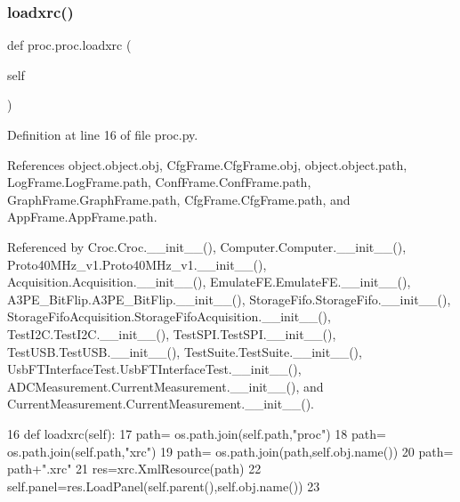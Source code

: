 \subsubsection{\texorpdfstring{loadxrc()}{loadxrc()}}
{\footnotesize\ttfamily def proc.\+proc.\+loadxrc (\begin{DoxyParamCaption}\item[{}]{self }\end{DoxyParamCaption})}



Definition at line 16 of file proc.\+py.



References object.\+object.\+obj, Cfg\+Frame.\+Cfg\+Frame.\+obj, object.\+object.\+path, Log\+Frame.\+Log\+Frame.\+path, Conf\+Frame.\+Conf\+Frame.\+path, Graph\+Frame.\+Graph\+Frame.\+path, Cfg\+Frame.\+Cfg\+Frame.\+path, and App\+Frame.\+App\+Frame.\+path.



Referenced by Croc.\+Croc.\+\_\+\+\_\+init\+\_\+\+\_\+(), Computer.\+Computer.\+\_\+\+\_\+init\+\_\+\+\_\+(), Proto40\+M\+Hz\+\_\+v1.\+Proto40\+M\+Hz\+\_\+v1.\+\_\+\+\_\+init\+\_\+\+\_\+(), Acquisition.\+Acquisition.\+\_\+\+\_\+init\+\_\+\+\_\+(), Emulate\+F\+E.\+Emulate\+F\+E.\+\_\+\+\_\+init\+\_\+\+\_\+(), A3\+P\+E\+\_\+\+Bit\+Flip.\+A3\+P\+E\+\_\+\+Bit\+Flip.\+\_\+\+\_\+init\+\_\+\+\_\+(), Storage\+Fifo.\+Storage\+Fifo.\+\_\+\+\_\+init\+\_\+\+\_\+(), Storage\+Fifo\+Acquisition.\+Storage\+Fifo\+Acquisition.\+\_\+\+\_\+init\+\_\+\+\_\+(), Test\+I2\+C.\+Test\+I2\+C.\+\_\+\+\_\+init\+\_\+\+\_\+(), Test\+S\+P\+I.\+Test\+S\+P\+I.\+\_\+\+\_\+init\+\_\+\+\_\+(), Test\+U\+S\+B.\+Test\+U\+S\+B.\+\_\+\+\_\+init\+\_\+\+\_\+(), Test\+Suite.\+Test\+Suite.\+\_\+\+\_\+init\+\_\+\+\_\+(), Usb\+F\+T\+Interface\+Test.\+Usb\+F\+T\+Interface\+Test.\+\_\+\+\_\+init\+\_\+\+\_\+(), A\+D\+C\+Measurement.\+Current\+Measurement.\+\_\+\+\_\+init\+\_\+\+\_\+(), and Current\+Measurement.\+Current\+Measurement.\+\_\+\+\_\+init\+\_\+\+\_\+().


\begin{DoxyCode}
16     \textcolor{keyword}{def }loadxrc(self):
17         path= os.path.join(self.path,\textcolor{stringliteral}{"proc"})
18         path= os.path.join(self.path,\textcolor{stringliteral}{"xrc"})
19         path= os.path.join(path,self.obj.name())
20         path= path+\textcolor{stringliteral}{".xrc"}
21         res=xrc.XmlResource(path)
22         self.panel=res.LoadPanel(self.parent(),self.obj.name())
23         
\end{DoxyCode}
\mbox{\label{classproc_1_1proc_a41bdd5dd3af283e3f0053c1a0c7fa7bf}} 
